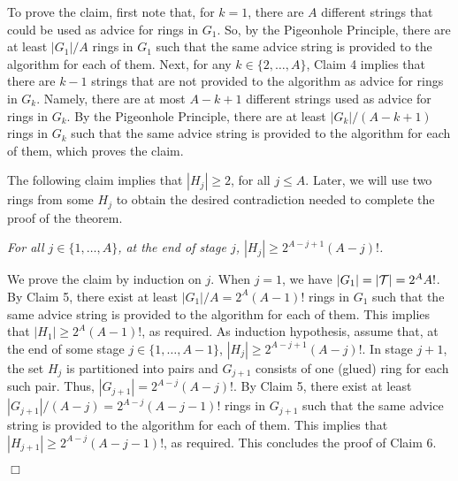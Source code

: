 \documentclass[11pt]{article}
\newcommand{\qed}{\hfill $\Box$ \bigbreak}
\newenvironment{proof}{\noindent {\bf Proof.}}{\qed}
\begin{document}
\begin{proof}
To prove the claim, first note that, for $k=1$, there are $A$ different strings that could be used as advice for rings in $G_1$. So, by the Pigeonhole Principle, there are at least $|G_1|/A$ rings in $G_1$ such that the same advice string is provided to the algorithm for each of them. Next, for any $k \in \{2,\ldots,A\}$, Claim 4 implies that there are $k-1$ strings that are not provided to the algorithm as advice for rings in $G_k$. Namely, there are at most $A-k+1$ different strings used as advice for rings in $G_k$. By the Pigeonhole Principle, there are at least $|G_k|/(A-k+1)$ rings in $G_k$ such that the same advice string is provided to the algorithm for each of them, which proves the claim.

The following claim implies that $|H_j| \geq 2$, for all $j \leq A$. Later, we will use two rings from some $H_j$ to obtain the desired contradiction needed to complete the proof of the theorem. 

\vspace{3mm} 
\textit{For all $j \in \{1,\ldots,A\}$, at the end of stage $j$, $|H_j| \geq 2^{A-j+1}(A-j)!$.}
\vspace{3mm} 

We prove the claim by induction on $j$. When $j=1$, we have $|G_1| = |{\cal T}| = 2^{A}A!$. By Claim 5, there exist at least $|G_1|/A = 2^{A}(A-1)!$ rings in $G_1$ such that the same advice string is provided to the algorithm for each of them. This implies that $|H_1| \geq 2^{A}(A-1)!$, as required. As induction hypothesis, assume that, at the end of some stage $j \in \{1,\ldots,A-1\}$, $|H_j| \geq 2^{A-j+1}(A-j)!$. In stage $j+1$, the set $H_{j}$ is partitioned into pairs and $G_{j+1}$ consists of one (glued) ring for each such pair. Thus, $|G_{j+1}| = 2^{A-j}(A-j)!$. By Claim 5, there exist at least $|G_{j+1}|/(A-j) = 2^{A-j}(A-j-1)!$ rings in $G_{j+1}$ such that the same advice string is provided to the algorithm for each of them. This implies that $|H_{j+1}| \geq 2^{A-j}(A-j-1)!$, as required. This concludes the proof of Claim 6.


\end{proof}
\end{document}
